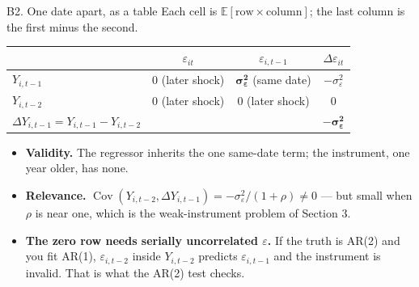 \documentclass[
  11pt,
  ignorenonframetext,
  aspectratio=169,
]{beamer}
\newcounter{none} %
\providecommand{\tightlist}{%
  \setlength{\itemsep}{0pt}\setlength{\parskip}{0pt}}
\begin{document}
\begin{frame}{B2. One date apart, as a table}
\protect{}\label{b2.-one-date-apart-as-a-table}
Each cell is \(\mathbb{E}[\text{row} \times \text{column}]\); the last
column is the first minus the second.

\begin{center}\small
\begin{tabular}{lccc}
\toprule
 & $\varepsilon_{it}$ & $\varepsilon_{i,t-1}$ & $\Delta\varepsilon_{it}$ \\
\midrule
$Y_{i,t-1}$ & $0$ (later shock) & $\boldsymbol{\sigma^2_\varepsilon}$ (same date) & $-\sigma^2_\varepsilon$ \\
$Y_{i,t-2}$ & $0$ (later shock) & $0$ (later shock) & $0$ \\
\midrule
$\Delta Y_{i,t-1} = Y_{i,t-1} - Y_{i,t-2}$ & & & $\boldsymbol{-\sigma^2_\varepsilon}$ \\
\bottomrule
\end{tabular}
\end{center}

\begin{itemize}
\tightlist
\item
  \textbf{Validity.} The regressor inherits the one same-date term; the
  instrument, one year older, has none.
\item
  \textbf{Relevance.}
  \(\operatorname{Cov}(Y_{i,t-2}, \Delta Y_{i,t-1}) = -\sigma^2_\varepsilon/(1+\rho) \ne 0\)
  --- but small when \(\rho\) is near one, which is the weak-instrument
  problem of Section 3.
\item
  \textbf{The zero row needs serially uncorrelated \(\varepsilon\).} If
  the truth is AR(2) and you fit AR(1), \(\varepsilon_{i,t-2}\) inside
  \(Y_{i,t-2}\) predicts \(\varepsilon_{i,t-1}\) and the instrument is
  invalid. That is what the AR(2) test checks.
\end{itemize}
\end{frame}
\end{document}

